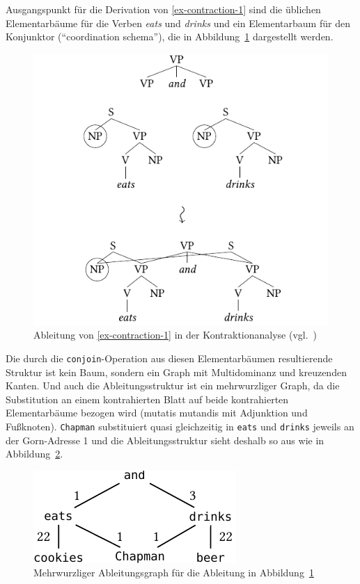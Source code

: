 Ausgangspunkt für die Derivation von \ref{ex-contraction-1} sind die üblichen Elementarbäume für die Verben {\it eats} und {\it drinks} und ein Elementarbaum für den Konjunktor ("`coordination schema"'), die in Abbildung~\ref{fig-contraction-1} dargestellt werden.
\begin{figure}[t]
\centering
\includegraphics{graphics/abb85.pdf}
\caption{\label{fig-contraction-1}Ableitung von \ref{ex-contraction-1} in der Kontraktionanalyse (vgl.\ \citealt[Figure~7]{Sarkar:Joshi:97})}
\end{figure}
Die durch die {\tt conjoin}-Operation aus diesen Elementarbäumen resultierende Struktur ist kein Baum, sondern ein Graph mit Multidominanz und kreuzenden Kanten. Und auch die Ableitungsstruktur ist ein mehrwurzliger Graph, da die Substitution an einem kontrahierten Blatt auf beide kontrahierten Elementarbäume bezogen wird (mutatis mutandis mit Adjunktion und Fu\ss knoten). {\tt Chapman} substituiert quasi gleichzeitig in {\tt eats} und {\tt drinks} jeweils an der Gorn-Adresse 1 und die Ableitungsstruktur sieht deshalb so aus wie in Abbildung~\ref{fig-contraction-2}.

\begin{figure}[t]
\centering
\includegraphics{graphics/abb86.pdf}
\caption{\label{fig-contraction-2}Mehrwurzliger Ableitungsgraph für die Ableitung in Abbildung~\ref{fig-contraction-1}}
\end{figure}

